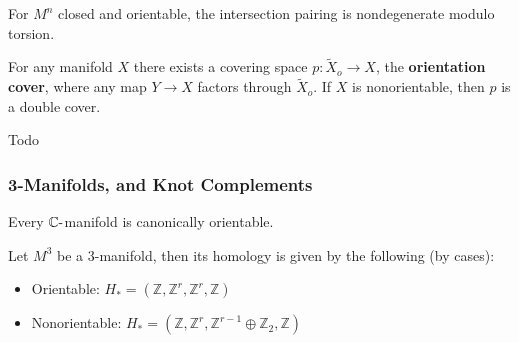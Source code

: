 
\begin{proposition}

For \(M^n\) closed and orientable, the intersection pairing is
nondegenerate modulo torsion.

\end{proposition}

\begin{proposition}

For any manifold \(X\) there exists a covering space
\(p: \tilde X_o\to X\), the \textbf{orientation cover}, where any map
\(Y\to X\) factors through \(\tilde X_o\). If \(X\) is nonorientable,
then \(p\) is a double cover.

\end{proposition}

\begin{theorem}

Todo

\end{theorem}


\hypertarget{manifolds-and-knot-complements}{%
\subsubsection{3-Manifolds, and Knot
Complements}\label{manifolds-and-knot-complements}}

\begin{fact}

Every \({\mathbb{C}}{\hbox{-}}\)manifold is canonically orientable.

\end{fact}

\begin{proposition}

Let \(M^3\) be a 3-manifold, then its homology is given by the following
(by cases):

\begin{itemize}
\item
  Orientable:
  \(H_* = ({\mathbb{Z}}, {\mathbb{Z}}^r, {\mathbb{Z}}^r, {\mathbb{Z}})\)
\item
  Nonorientable:
  \(H_* = ({\mathbb{Z}}, {\mathbb{Z}}^r, {\mathbb{Z}}^{r-1} \oplus {\mathbb{Z}}_2, {\mathbb{Z}})\)
\end{itemize}

\end{proposition}

